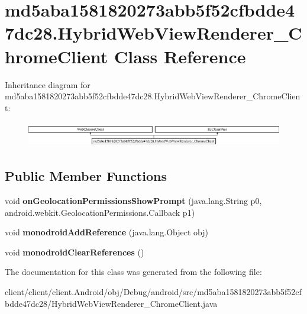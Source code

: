 \hypertarget{classmd5aba1581820273abb5f52cfbdde47dc28_1_1HybridWebViewRenderer__ChromeClient}{}\section{md5aba1581820273abb5f52cfbdde47dc28.\+Hybrid\+Web\+View\+Renderer\+\_\+\+Chrome\+Client Class Reference}
\label{classmd5aba1581820273abb5f52cfbdde47dc28_1_1HybridWebViewRenderer__ChromeClient}
Inheritance diagram for md5aba1581820273abb5f52cfbdde47dc28.\+Hybrid\+Web\+View\+Renderer\+\_\+\+Chrome\+Client\+:\begin{figure}[H]
\begin{center}
\leavevmode
\includegraphics[height=1.138211cm]{classmd5aba1581820273abb5f52cfbdde47dc28_1_1HybridWebViewRenderer__ChromeClient}
\end{center}
\end{figure}
\subsection*{Public Member Functions}
\begin{DoxyCompactItemize}
\item 
\hypertarget{classmd5aba1581820273abb5f52cfbdde47dc28_1_1HybridWebViewRenderer__ChromeClient_acd6b9cee8061322d08764cce0c7d6900}{}void {\bfseries on\+Geolocation\+Permissions\+Show\+Prompt} (java.\+lang.\+String p0, android.\+webkit.\+Geolocation\+Permissions.\+Callback p1)\label{classmd5aba1581820273abb5f52cfbdde47dc28_1_1HybridWebViewRenderer__ChromeClient_acd6b9cee8061322d08764cce0c7d6900}

\item 
\hypertarget{classmd5aba1581820273abb5f52cfbdde47dc28_1_1HybridWebViewRenderer__ChromeClient_a3956799cb388398f715abb8df691be8e}{}void {\bfseries monodroid\+Add\+Reference} (java.\+lang.\+Object obj)\label{classmd5aba1581820273abb5f52cfbdde47dc28_1_1HybridWebViewRenderer__ChromeClient_a3956799cb388398f715abb8df691be8e}

\item 
\hypertarget{classmd5aba1581820273abb5f52cfbdde47dc28_1_1HybridWebViewRenderer__ChromeClient_a432e1645fa72bdc1eaf4f600f2a8e98f}{}void {\bfseries monodroid\+Clear\+References} ()\label{classmd5aba1581820273abb5f52cfbdde47dc28_1_1HybridWebViewRenderer__ChromeClient_a432e1645fa72bdc1eaf4f600f2a8e98f}

\end{DoxyCompactItemize}


The documentation for this class was generated from the following file\+:\begin{DoxyCompactItemize}
\item 
client/client/client.\+Android/obj/\+Debug/android/src/md5aba1581820273abb5f52cfbdde47dc28/Hybrid\+Web\+View\+Renderer\+\_\+\+Chrome\+Client.\+java\end{DoxyCompactItemize}
